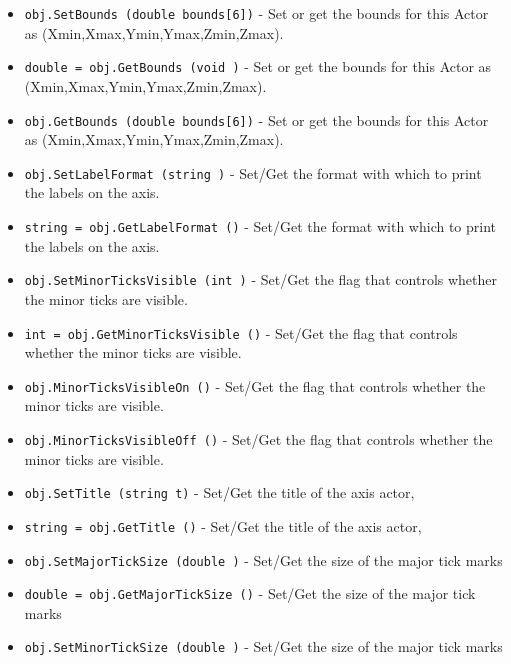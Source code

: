 \begin{itemize}
\item  \verb|obj.SetBounds (double bounds[6])| -  Set or get the bounds for this Actor as (Xmin,Xmax,Ymin,Ymax,Zmin,Zmax).

\item  \verb|double = obj.GetBounds (void )| -  Set or get the bounds for this Actor as (Xmin,Xmax,Ymin,Ymax,Zmin,Zmax).

\item  \verb|obj.GetBounds (double bounds[6])| -  Set or get the bounds for this Actor as (Xmin,Xmax,Ymin,Ymax,Zmin,Zmax).

\item  \verb|obj.SetLabelFormat (string )| -  Set/Get the format with which to print the labels on the axis.

\item  \verb|string = obj.GetLabelFormat ()| -  Set/Get the format with which to print the labels on the axis.

\item  \verb|obj.SetMinorTicksVisible (int )| -  Set/Get the flag that controls whether the minor ticks are visible. 

\item  \verb|int = obj.GetMinorTicksVisible ()| -  Set/Get the flag that controls whether the minor ticks are visible. 

\item  \verb|obj.MinorTicksVisibleOn ()| -  Set/Get the flag that controls whether the minor ticks are visible. 

\item  \verb|obj.MinorTicksVisibleOff ()| -  Set/Get the flag that controls whether the minor ticks are visible. 

\item  \verb|obj.SetTitle (string t)| -  Set/Get the title of the axis actor,

\item  \verb|string = obj.GetTitle ()| -  Set/Get the title of the axis actor,

\item  \verb|obj.SetMajorTickSize (double )| -  Set/Get the size of the major tick marks 

\item  \verb|double = obj.GetMajorTickSize ()| -  Set/Get the size of the major tick marks 

\item  \verb|obj.SetMinorTickSize (double )| -  Set/Get the size of the major tick marks 


\end{itemize}
